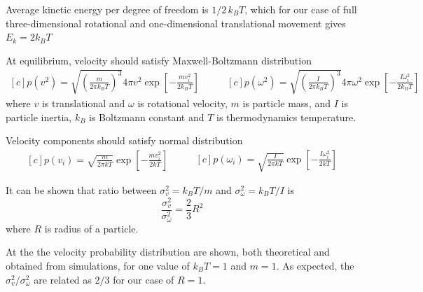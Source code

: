 Average kinetic energy per degree of freedom is $1/2 \, k_B T$, which for our case of full three-dimensional rotational and one-dimensional translational movement gives $E_k = 2 k_B T$

At equilibrium, velocity should satisfy Maxwell-Boltzmann distribution
\begin{equation}
\label{eq:maxwell_boltzmann_velocity}
	\begin{aligned}[c]
		p(v^2)
			= \sqrt{ \left(\frac{m}{2 \pi k_B T}\right)^3}
			4 \pi v^2 \exp \left[-\frac{mv_i^2}{2k_BT}\right]
	\end{aligned}
	\qquad
	\begin{aligned}[c]
		p(\omega^2)
			= \sqrt{ \left(\frac{I}{2 \pi k_B T}\right)^3}
			4 \pi \omega^2 \exp\left[-\frac{I\omega_i^2}{2 k_B T}\right]
	\end{aligned}
\end{equation}
where $v$ is translational and $\omega$ is rotational velocity, $m$ is particle mass, and $I$ is particle inertia, $k_B$ is Boltzmann constant and $T$ is thermodynamics temperature.

Velocity components should satisfy normal distribution 
\begin{equation}
\label{eq:maxwell_boltzmann_velocity_components}
	\begin{aligned}[c]
		p(v_i)
			= \sqrt{ \frac{m}{2 \pi k T}}
			\exp \left[-\frac{mv_i^2}{2kT}\right]
	\end{aligned}
	\qquad
	\begin{aligned}[c]
		p(\omega_i)
			= \sqrt{ \frac{I}{2 \pi k T}}
			\exp\left[-\frac{I\omega_i^2}{2kT}\right]
	\end{aligned}
\end{equation}

It can be shown that ratio between $\sigma^2_v = k_BT/m$ and $\sigma^2_\omega = k_BT/I$ is
\begin{equation}
\label{eq:velocity_deviation_relation}
	\frac{\sigma^2_v}{\sigma^2_\omega} = \frac{2}{3}R^2
\end{equation}
where $R$ is radius of a particle.

At the  the velocity probability distribution are shown, both theoretical and obtained from simulations, for one value of $k_BT = 1$ and $m = 1$. As expected, the $\sigma^2_v / \sigma^2_\omega$ are related as $2/3$ for our case of $R = 1$.

